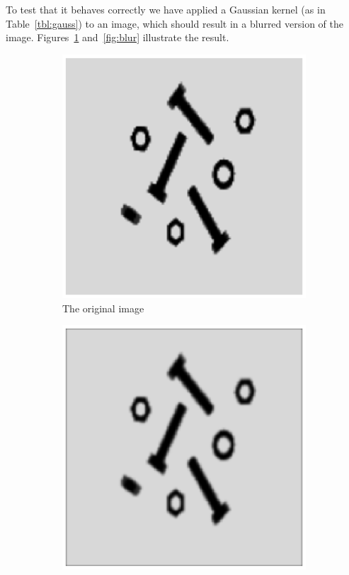 To test that it behaves correctly we have applied a Gaussian kernel (as in Table~\ref{tbl:gauss}) to an image, which should result in a blurred version of the image.
Figures~\ref{fig:nonblur} and~\ref{fig:blur} illustrate the result.
\begin{figure}[!htb]
 \centering
 \begin{subfigure}[b]{0.49\linewidth}
  \includegraphics[width=\textwidth]{notBlurred.eps} 
  \caption{The original image \newline~\newline}
  \label{fig:nonblur} 
 \end{subfigure}
 \begin{subfigure}[b]{0.49\linewidth}
  \includegraphics[width=\textwidth]{blurred.eps}

\end{subfigure}
\end{figure}
